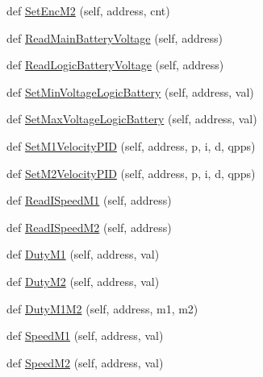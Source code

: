 \begin{DoxyCompactItemize}
\item 
def \mbox{\hyperlink{classtoxic__hardware_1_1roboclaw__3_1_1Roboclaw_ad56efca8ac84b62cbe49277e817531fd}{Set\+Enc\+M2}} (self, address, cnt)
\item 
def \mbox{\hyperlink{classtoxic__hardware_1_1roboclaw__3_1_1Roboclaw_ab482c449401cb4c5544f79c526874605}{Read\+Main\+Battery\+Voltage}} (self, address)
\item 
def \mbox{\hyperlink{classtoxic__hardware_1_1roboclaw__3_1_1Roboclaw_ae75e459718100e766de7a3bed8590540}{Read\+Logic\+Battery\+Voltage}} (self, address)
\item 
def \mbox{\hyperlink{classtoxic__hardware_1_1roboclaw__3_1_1Roboclaw_a7f8f846062bf3f16e1f973e47f057959}{Set\+Min\+Voltage\+Logic\+Battery}} (self, address, val)
\item 
def \mbox{\hyperlink{classtoxic__hardware_1_1roboclaw__3_1_1Roboclaw_a9adc230e2d7ebbb15c0ede60f1fb634e}{Set\+Max\+Voltage\+Logic\+Battery}} (self, address, val)
\item 
def \mbox{\hyperlink{classtoxic__hardware_1_1roboclaw__3_1_1Roboclaw_abee646d10546f0e4f5eaf71b2c57fcd7}{Set\+M1\+Velocity\+P\+ID}} (self, address, p, i, d, qpps)
\item 
def \mbox{\hyperlink{classtoxic__hardware_1_1roboclaw__3_1_1Roboclaw_a7259be4b5175df4c6192fd8284149911}{Set\+M2\+Velocity\+P\+ID}} (self, address, p, i, d, qpps)
\item 
def \mbox{\hyperlink{classtoxic__hardware_1_1roboclaw__3_1_1Roboclaw_a4b490cc3659d99d39ebc15688c47ce56}{Read\+I\+Speed\+M1}} (self, address)
\item 
def \mbox{\hyperlink{classtoxic__hardware_1_1roboclaw__3_1_1Roboclaw_afd8cb73570b22b81fcd73b7ee06fb887}{Read\+I\+Speed\+M2}} (self, address)
\item 
def \mbox{\hyperlink{classtoxic__hardware_1_1roboclaw__3_1_1Roboclaw_a6034a0675ee9fa84a7b8612f4ca58f2e}{Duty\+M1}} (self, address, val)
\item 
def \mbox{\hyperlink{classtoxic__hardware_1_1roboclaw__3_1_1Roboclaw_aa6c8d3f2eded41f79aa4d0a54487a91d}{Duty\+M2}} (self, address, val)
\item 
def \mbox{\hyperlink{classtoxic__hardware_1_1roboclaw__3_1_1Roboclaw_a53f95c68c9291318fb7b96258be4297f}{Duty\+M1\+M2}} (self, address, m1, m2)
\item 
def \mbox{\hyperlink{classtoxic__hardware_1_1roboclaw__3_1_1Roboclaw_a81e68c3b9e3b5bf68f6705da7a31fb9c}{Speed\+M1}} (self, address, val)
\item 
def \mbox{\hyperlink{classtoxic__hardware_1_1roboclaw__3_1_1Roboclaw_ab242a7b2c3280147281cc7e2a163e1e6}{Speed\+M2}} (self, address, val)

\end{DoxyCompactItemize}
